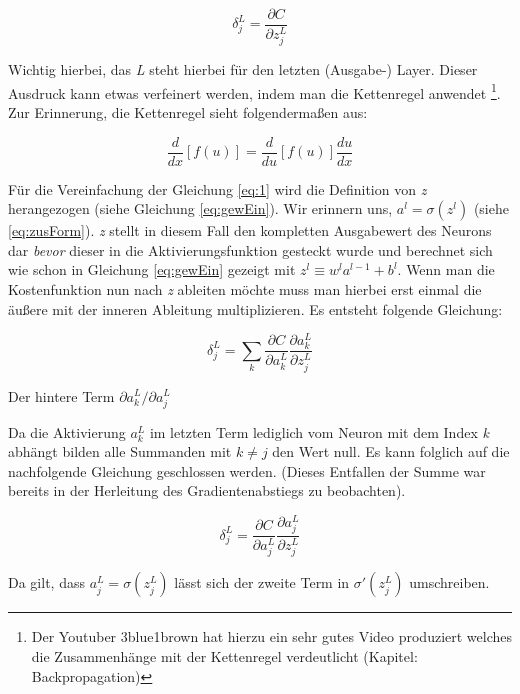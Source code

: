 \begin{equation} \label{eq:1}
\delta^L_j = \frac{\partial C}{\partial z^L_j}
\end{equation}

Wichtig hierbei, das \emph{L} steht hierbei für den letzten (Ausgabe-) Layer. Dieser Ausdruck kann etwas verfeinert werden, indem man die Kettenregel anwendet \footnote{Der Youtuber 3blue1brown hat hierzu ein sehr gutes Video produziert welches die Zusammenhänge mit der Kettenregel verdeutlicht \cite{3b1b} (Kapitel: Backpropagation)}. Zur Erinnerung, die Kettenregel sieht folgendermaßen aus:  

\begin{equation}
\frac{d}{{dx}}\left[ {f\left( u \right)} \right] = \frac{d}{{du}}\left[ {f\left( u \right)} \right]\frac{{du}}{{dx}}
\end{equation}

Für die Vereinfachung der Gleichung \ref{eq:1} wird die Definition von \emph{z} herangezogen (siehe Gleichung \ref{eq:gewEin}). Wir erinnern uns, $a^l = \sigma(z^l)$ (siehe \ref{eq:zusForm}). \emph{z} stellt in diesem Fall den kompletten Ausgabewert des Neurons dar \emph{bevor} dieser in die Aktivierungsfunktion gesteckt wurde und berechnet sich wie schon in Gleichung \ref{eq:gewEin} gezeigt mit ${z^l \equiv w^l a^{l-1}+b^l}$. Wenn man die Kostenfunktion nun nach \emph{z} ableiten möchte muss man hierbei erst einmal die äußere mit der inneren Ableitung multiplizieren. Es entsteht folgende Gleichung: 

\begin{equation}
\delta^L_j = \sum_k \frac{\partial C}{\partial a^L_k} \frac{\partial a^L_k}{\partial z^L_j}
\end{equation}

Der hintere Term $\partial a^L_k / \partial a^L_j$

Da die Aktivierung $a^L_k$ im letzten Term lediglich vom Neuron mit dem Index \emph{k} abhängt bilden alle Summanden mit $k \neq j$ den Wert null. Es kann folglich auf die nachfolgende Gleichung geschlossen werden. (Dieses Entfallen der Summe war bereits in der Herleitung des Gradientenabstiegs zu beobachten). 

\begin{equation}
\delta^L_j = \frac{\partial C}{\partial a^L_j} \frac{\partial a^L_j}{\partial z^L_j}
\end{equation}

Da gilt, dass $a^L_j = \sigma(z^L_j)$ lässt sich der zweite Term in $\sigma'(z^L_j)$ umschreiben. 

